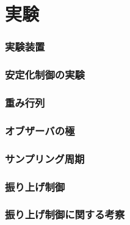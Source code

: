\chapter{実験}

\subsection{実験装置}

\subsection{安定化制御の実験}

\subsection{重み行列}

\subsection{オブザーバの極}

\subsection{サンプリング周期}

\subsection{振り上げ制御}

\subsection{振り上げ制御に関する考察}



